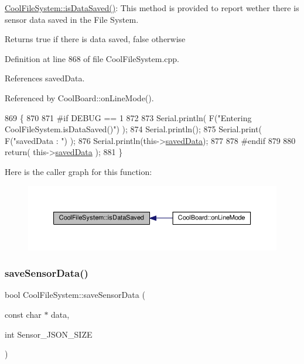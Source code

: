 \hyperlink{classCoolFileSystem_a5a7eaeea7a9fbf8aaef651d862fa3b5b}{Cool\+File\+System\+::is\+Data\+Saved()}\+: This method is provided to report wether there is sensor data saved in the File System.

\begin{DoxyReturn}{Returns}
true if there is data saved, false otherwise 
\end{DoxyReturn}


Definition at line 868 of file Cool\+File\+System.\+cpp.



References saved\+Data.



Referenced by Cool\+Board\+::on\+Line\+Mode().


\begin{DoxyCode}
869 \{
870 
871 \textcolor{preprocessor}{#if DEBUG == 1 }
872 
873     Serial.println( F(\textcolor{stringliteral}{"Entering CoolFileSystem.isDataSaved()"}) );
874     Serial.println();
875     Serial.print( F(\textcolor{stringliteral}{"savedData : "}) );
876     Serial.println(this->\hyperlink{classCoolFileSystem_ad398e0c5c41a0c88acdf5d672aa71351}{savedData});
877 
878 \textcolor{preprocessor}{#endif}
879 
880     \textcolor{keywordflow}{return}( this->\hyperlink{classCoolFileSystem_ad398e0c5c41a0c88acdf5d672aa71351}{savedData} );
881 \}
\end{DoxyCode}
Here is the caller graph for this function\+:\nopagebreak
\begin{figure}[H]
\begin{center}
\leavevmode
\includegraphics[width=350pt]{classCoolFileSystem_a5a7eaeea7a9fbf8aaef651d862fa3b5b_icgraph}
\end{center}
\end{figure}
\mbox{\label{classCoolFileSystem_a4c560c2ddd40b74b7758e6ceb2c58957}} 
\subsubsection{\texorpdfstring{save\+Sensor\+Data()}{saveSensorData()}}
{\footnotesize\ttfamily bool Cool\+File\+System\+::save\+Sensor\+Data (\begin{DoxyParamCaption}\item[{const char $\ast$}]{data,  }\item[{int}]{Sensor\+\_\+\+J\+S\+O\+N\+\_\+\+S\+I\+ZE }\end{DoxyParamCaption})}

